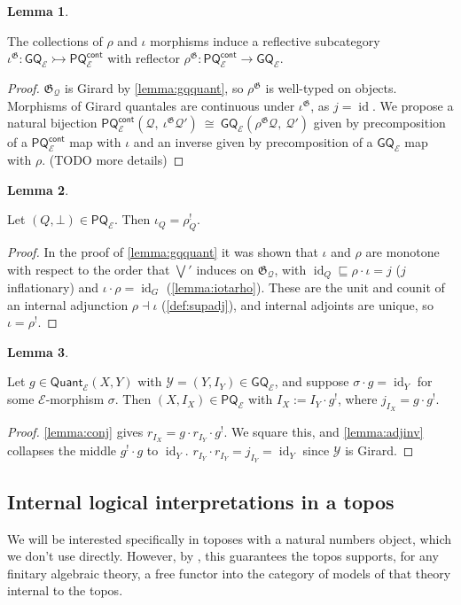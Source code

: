 \documentclass{article}
\makeatletter
\newcommand{\allproofs}{} %
\newif\ifproofsinappendix
\newcommand{\lemmawithproof}[3]{%
  \begin{lemma}\label{#1}
    #2  
    \ifproofsinappendix \hyperref[xxx#1]{(Proof)} \fi
  \end{lemma}
    \ifproofsinappendix
  \g@addto@macro\allproofs{%
    \par\medskip
    \noindent
    \subsection*{\cref{#1}}\par
    #2\par
    \begin{proof}\label{xxx#1}
      #3
    \end{proof}%
  }
      \else

    \begin{proof}
      #3
    \end{proof}
    \fi 
}
\theoremstyle{definition}
\newtheorem{lemma}{Lemma}[section]
\newcommand{\G}{\mathfrak{G}}
\newcommand{\cE}{\mathcal{E}}
\newcommand{\cQ}{\mathcal{Q}}
\newcommand{\cY}{\mathcal{Y}}
\newcommand{\cat}[1]{\mathsf{#1}}
\newcommand{\id}{\operatorname{id}}
\makeatother
\begin{document}
\lemmawithproof{lemma:reflgq}{
    The collections of $\rho$ and $\iota$ morphisms induce a reflective subcategory $\iota^\G \colon \cat{GQ}_\cE \rightarrowtail \cat{PQ_\cE^{cont}}$ with reflector $\rho^\G \colon \cat{PQ_\cE^{cont}}\to \cat{GQ}_\cE$. 
}{
$\G_\cQ$ is Girard by \cref{lemma:gqquant}, so $\rho^\G$ is well-typed on objects. Morphisms of Girard quantales are continuous under $\iota^\G$, as $j=\id$. We propose a natural bijection $\cat{PQ_\cE^{cont}}(\cQ,\ \iota^\G\cQ')\ \cong\ \cat{GQ}_\cE(\rho^\G\cQ,\ \cQ')$ given by precomposition of a $\cat{PQ_\cE^{cont}}$ map with $\iota$ and an inverse given by precomposition of a $\cat{GQ_\cE}$ map with $\rho$. (TODO more details)
}



\lemmawithproof{lemma:iotarho2}{
    Let $(Q,\bot)\in \cat{PQ}_\cE$. Then $\iota_Q=\rho_Q^!$.
}{
In the proof of \cref{lemma:gqquant} it was shown that $\iota$ and $\rho$ are monotone with respect to the order that $\bigvee'$ induces on $\G_\cQ$, with $\id_Q\sqsubseteq\rho\cdot\iota=j$ ($j$ inflationary) and $\iota\cdot\rho=\id_G$ (\cref{lemma:iotarho}). These are the unit and counit of an internal adjunction $\rho\dashv\iota$ (\cref{def:supadj}), and internal adjoints are unique, so $\iota=\rho^!$.
}


\lemmawithproof{lemma:jcollapse}{
Let $g\in\cat{Quant}_\cE(X,Y)$ with $\cY=(Y,I_Y)\in\cat{GQ}_\cE$, and suppose
$\sigma\cdot g=\id_Y$ for some $\cE$-morphism $\sigma$. Then $(X,I_X) \in \cat{PQ}_\cE$ with $I_X:=I_Y\cdot g^!$, where $j_{I_X}=g\cdot g^!$.
}{
\cref{lemma:conj} gives $r_{I_X}=g\cdot r_{I_Y}\cdot g^!$. We square this, and \cref{lemma:adjinv}
collapses the middle $g^!\cdot g$ to $\id_Y$. $r_{I_Y}\cdot r_{I_Y}=j_{I_Y}=\id_Y$ since
$\cY$ is Girard.
}


\subsection{Internal logical interpretations in a topos}
\label{sec:intlogic}
We will be interested specifically in toposes with a natural numbers object, which we don't use directly. However, by \cite{johnstone2006algebraic}, this guarantees the topos supports, for any finitary algebraic theory, a free functor into the category of models of that theory internal to the topos. 
\end{document}
